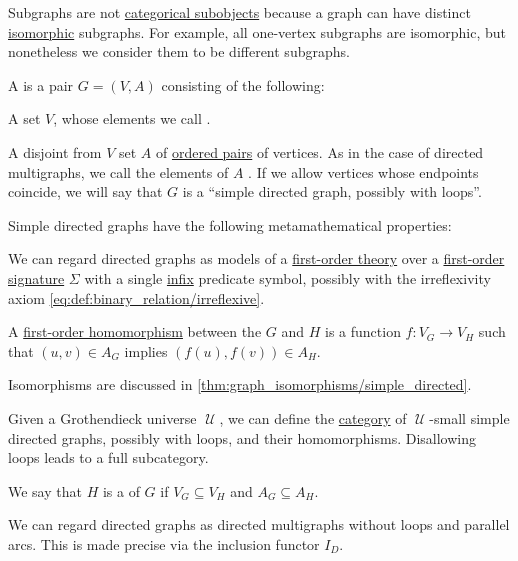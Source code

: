 \begin{remark}\label{rem:subgraphs_and_subobjects}
  Subgraphs are not \hyperref[def:subobject_and_quotient]{categorical subobjects} because a graph can have distinct \hyperref[thm:graph_isomorphisms]{isomorphic} subgraphs. For example, all one-vertex subgraphs are isomorphic, but nonetheless we consider them to be different subgraphs.
\end{remark}

\begin{definition}\label{def:directed_graph}
  A  is a pair \( G = (V, A) \) consisting of the following:
  \begin{thmenum}[series=def:directed_graph]
     A set \( V \), whose elements we call .

     A disjoint from \( V \) set \( A \) of \hyperref[def:ordered_tuple]{ordered pairs} of  vertices. As in the case of directed multigraphs, we call the elements of \( A \) . If we allow vertices whose endpoints coincide, we will say that \( G \) is a \enquote{simple directed graph, possibly with loops}.
  \end{thmenum}

  Simple directed graphs have the following metamathematical properties:
  \begin{thmenum}[resume=def:directed_graph]
    \mimprovised We can regard directed graphs as models of a \hyperref[def:first_order_theory]{first-order theory} over a \hyperref[def:first_order_signature]{first-order signature} \( \Sigma \) with a single \hyperref[def:function_application_syntax]{infix} predicate symbol, possibly with the irreflexivity axiom \eqref{eq:def:binary_relation/irreflexive}.

    \mimprovised A \hyperref[def:first_order_homomorphism]{first-order homomorphism} between the \( G \) and \( H \) is a function \( f: V_G \to V_H \) such that \( (u, v) \in A_G \) implies \( (f(u), f(v)) \in A_H \).

    Isomorphisms are discussed in \cref{thm:graph_isomorphisms/simple_directed}.

    \mimprovised Given a Grothendieck universe \( \mscrU \), we can define the \hyperref[def:category]{category} of \( \mscrU \)-small simple directed graphs, possibly with loops, and their homomorphisms. Disallowing loops leads to a full subcategory.

    \mimprovised We say that \( H \) is a  of \( G \) if \( V_G \subseteq V_H \) and \( A_G \subseteq A_H \).
  \end{thmenum}
\end{definition}
\begin{comments}
  \item We can regard directed graphs as directed multigraphs without loops and parallel arcs. This is made precise via the inclusion functor \hyperref[def:graph_functors/directed_inclusion]{\( I_D \)}.
\end{comments}


